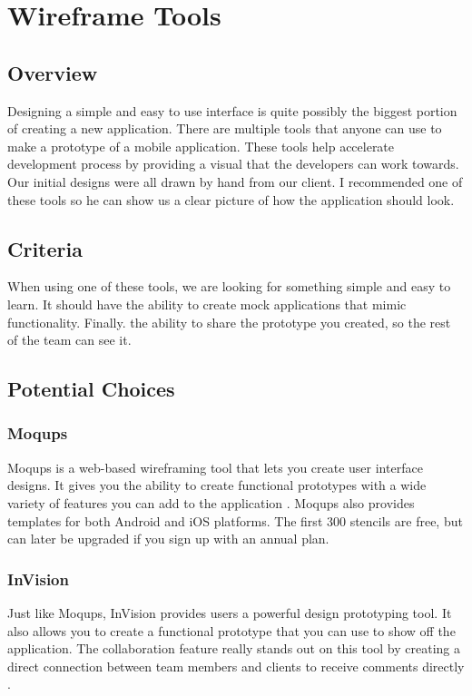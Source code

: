 \documentclass[onecolumn, draftclsnofoot,10pt, compsoc]{IEEEtran}
\begin{document}
\clearpage
\section{Wireframe Tools}
\subsection{Overview}

Designing a simple and easy to use interface is quite possibly the biggest portion of creating a new application. There are multiple tools that anyone can use to make a prototype of a mobile application. These tools help accelerate development process by providing a visual that the developers can work towards. Our initial designs were all drawn by hand from our client. I recommended one of these tools so he can show us a clear picture of how the application should look.

\subsection{Criteria}

When using one of these tools, we are looking for something simple and easy to learn. It should have the ability to create mock applications that mimic functionality. Finally. the ability to share the prototype you created, so the rest of the team can see it.

\subsection{Potential Choices}
\subsubsection{Moqups}

Moqups is a web-based wireframing tool that lets you create user interface designs. It gives you the ability to create functional prototypes with a wide variety of features you can add to the application \cite{Moqups}. Moqups also provides templates for both Android and iOS platforms. The first 300 stencils are free, but can later be upgraded if you sign up with an annual plan.

\subsubsection{InVision}

Just like Moqups, InVision provides users a powerful design prototyping tool. It also allows you to create a functional prototype that you can use to show off the application. The collaboration feature really stands out on this tool by creating a direct connection between team members and clients to receive comments directly \cite{invision}. 
\end{document}
